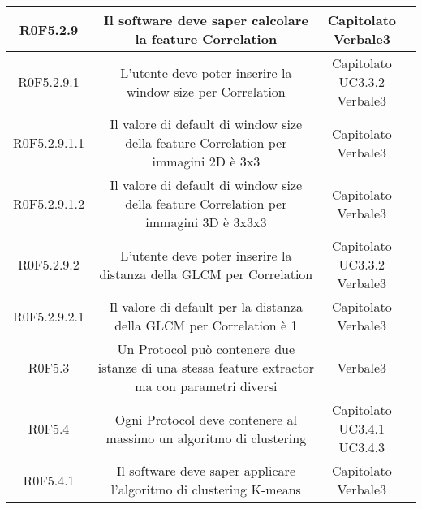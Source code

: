 \begin{center}
\begin{longtable}{|c|c|c|c|}
\hline
R0F5.2.9   & \parbox[t]{\larghezza}{Il software deve saper calcolare la feature\glossario{} Correlation}  & \parbox[t]{\dimFonti}{ Capitolato \\ Verbale3 \\} \\
\hline
R0F5.2.9.1   & \parbox[t]{\larghezza}{L'utente deve poter inserire la window size per Correlation}  & \parbox[t]{\dimFonti}{ Capitolato \\ UC3.3.2 \\ Verbale3 \\} \\
\hline
R0F5.2.9.1.1   & \parbox[t]{\larghezza}{Il valore di default di window size della feature\glossario{} Correlation per immagini 2D è 3x3 }  & \parbox[t]{\dimFonti}{ Capitolato \\ Verbale3 \\} \\
\hline
R0F5.2.9.1.2   & \parbox[t]{\larghezza}{Il valore di default di window size della feature\glossario{} Correlation per immagini 3D è 3x3x3}  & \parbox[t]{\dimFonti}{ Capitolato \\ Verbale3 \\} \\
\hline
R0F5.2.9.2   & \parbox[t]{\larghezza}{L'utente deve poter inserire la distanza della GLCM per Correlation}  & \parbox[t]{\dimFonti}{ Capitolato \\ UC3.3.2 \\ Verbale3 \\} \\
\hline
R0F5.2.9.2.1   & \parbox[t]{\larghezza}{Il valore di default per la distanza della GLCM per Correlation è 1}  & \parbox[t]{\dimFonti}{ Capitolato \\ Verbale3 \\} \\
\hline
R0F5.3   & \parbox[t]{\larghezza}{Un Protocol\glossario{} può contenere due istanze di una stessa feature extractor\glossario{} ma con parametri diversi}  & \parbox[t]{\dimFonti}{ Verbale3 \\} \\
\hline
R0F5.4   & \parbox[t]{\larghezza}{Ogni Protocol\glossario{} deve contenere al massimo un algoritmo di clustering\glossario{}}  & \parbox[t]{\dimFonti}{ Capitolato \\ UC3.4.1 \\ UC3.4.3 \\} \\
\hline
R0F5.4.1   & \parbox[t]{\larghezza}{Il software deve saper applicare l'algoritmo di clustering\glossario{} K-means\glossario{}}  & \parbox[t]{\dimFonti}{ Capitolato \\ Verbale3 \\} \\

\end{longtable}
\end{center}
